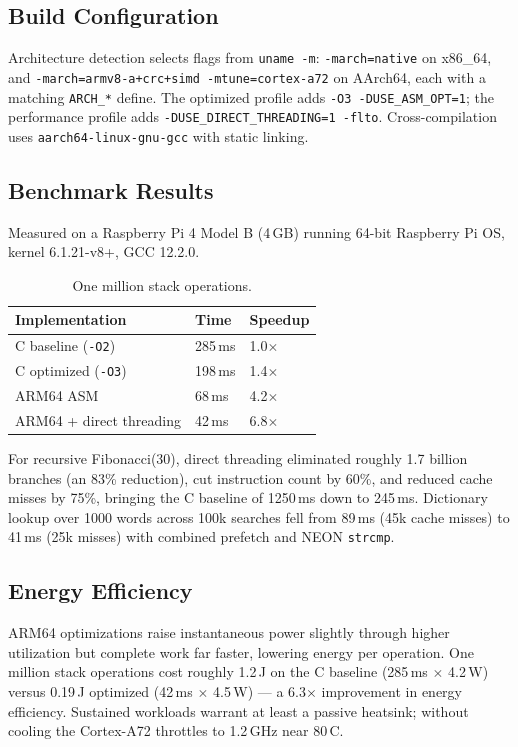 \subsection{Build Configuration}

Architecture detection selects flags from \texttt{uname -m}: \texttt{-march=native}
on x86\_64, and \texttt{-march=armv8-a+crc+simd -mtune=cortex-a72} on AArch64,
each with a matching \texttt{ARCH\_*} define. The optimized profile adds
\texttt{-O3 -DUSE\_ASM\_OPT=1}; the performance profile adds
\texttt{-DUSE\_DIRECT\_THREADING=1 -flto}. Cross-compilation uses
\texttt{aarch64-linux-gnu-gcc} with static linking.

\subsection{Benchmark Results}

Measured on a Raspberry Pi 4 Model B (4\,GB) running 64-bit Raspberry Pi OS,
kernel 6.1.21-v8+, GCC 12.2.0.

\begin{table}[h]
\centering
\begin{tabular}{lll}
\toprule
Implementation & Time & Speedup \\
\midrule
C baseline (\texttt{-O2}) & 285\,ms & 1.0$\times$ \\
C optimized (\texttt{-O3}) & 198\,ms & 1.4$\times$ \\
ARM64 ASM & 68\,ms & 4.2$\times$ \\
ARM64 + direct threading & 42\,ms & 6.8$\times$ \\
\bottomrule
\end{tabular}
\caption{One million stack operations.}
\end{table}

For recursive Fibonacci(30), direct threading eliminated roughly 1.7 billion
branches (an 83\% reduction), cut instruction count by 60\%, and reduced cache
misses by 75\%, bringing the C baseline of 1250\,ms down to 245\,ms. Dictionary
lookup over 1000 words across 100k searches fell from 89\,ms (45k cache misses)
to 41\,ms (25k misses) with combined prefetch and NEON \texttt{strcmp}.

\subsection{Energy Efficiency}

ARM64 optimizations raise instantaneous power slightly through higher
utilization but complete work far faster, lowering energy per operation. One
million stack operations cost roughly 1.2\,J on the C baseline
(285\,ms $\times$ 4.2\,W) versus 0.19\,J optimized (42\,ms $\times$ 4.5\,W) ---
a 6.3$\times$ improvement in energy efficiency. Sustained workloads warrant at
least a passive heatsink; without cooling the Cortex-A72 throttles to 1.2\,GHz
near 80\,\textdegree{}C.

